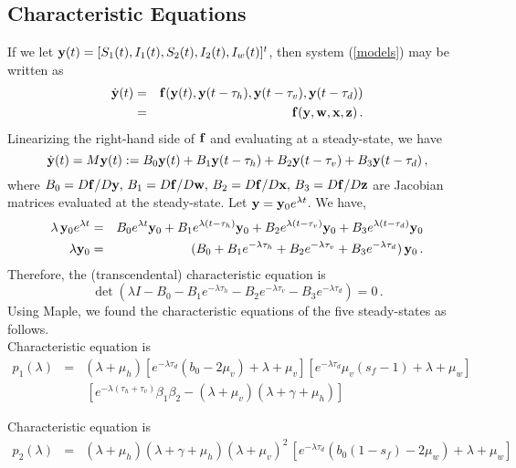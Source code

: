 \documentclass[12pt,leqno]{article}
\begin{document}
\subsection{Characteristic Equations}
If we let ${\bf y}(t) = [S_1(t),I_1(t),S_2(t),I_2(t),I_w(t)]^t$, then system (\ref{models}) may be written as
\begin{eqnarray*}
\dot{{\bf y}}(t) &=& {\bf f}({\bf y}(t),{\bf y}(t-\tau_h),{\bf y}(t-\tau_v),{\bf y}(t-\tau_d))\\
&=& {\bf f}({\bf y},{\bf w},{\bf x},{\bf z})\,.
\end{eqnarray*}
Linearizing the right-hand side of ${\bf f}$ and evaluating at a steady-state, we have
$$
\dot{\bf y}(t) = M{\bf y}(t) := B_0{\bf y}(t) + B_1{\bf y}(t-\tau_h) + B_2{\bf y}(t-\tau_v) + B_3 {\bf y}(t-\tau_d)\,,
$$
where $B_0 = D{\bf f}/D{\bf y},\,B_1 = D{\bf f}/D{\bf w},\,B_2 = D{\bf f}/D{\bf x},\,B_3 = D{\bf f}/D{\bf z}$ are Jacobian matrices evaluated at the steady-state. Let ${\bf y} = {\bf y}_0 e^{\lambda t}$. We have,
\begin{eqnarray*}
\lambda\,{\bf y}_0e^{\lambda t} &=& B_0e^{\lambda t}{\bf y}_0 + B_1e^{\lambda(t-\tau_h)}{\bf y}_0 + B_2 e^{\lambda(t-\tau_v)}{\bf y}_0 + B_3 e^{\lambda(t-\tau_d)}{\bf y}_0\\
\lambda {\bf y}_0 &=& (B_0 + B_1e^{-\lambda \tau_h} + B_2 e^{-\lambda \tau_v} + B_3 e^{-\lambda \tau_d})\,{\bf y}_0\,. 
\end{eqnarray*}
Therefore, the (transcendental) characteristic equation is
\begin{equation}\label{chareqn}
\det (\lambda I - B_0 - B_1e^{-\lambda \tau_h} - B_2 e^{-\lambda \tau_v} - B_3e^{-\lambda \tau_d}) = 0\,.
\end{equation}
Using Maple, we found the characteristic equations of the five steady-states as follows.\\

\quad
Characteristic equation is
\begin{eqnarray*}
p_1(\lambda) &=& (\lambda+\mu_h)
[e^{-\lambda\tau_d}(b_0-2\mu_v) + \lambda+\mu_v] [e^{-\lambda\tau_d}\mu_v(s_f-1)+\lambda+\mu_w]\\
& & \, [e^{-\lambda(\tau_h+\tau_v)}\beta_1\beta_2 - (\lambda+\mu_v)(\lambda+\gamma+\mu_h)]
\end{eqnarray*}

\quad Characteristic equation is
\begin{eqnarray*}
p_2(\lambda) &=& (\lambda + \mu_h)(\lambda + \gamma + \mu_h)(\lambda + \mu_v)^2\,[e^{-\lambda \tau_d}(b_0(1-s_f)-2\mu_w) + \lambda + \mu_w]
\end{eqnarray*}
\end{document}
